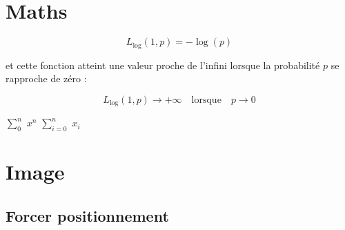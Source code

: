 \documentclass[12pt,a4paper]{article}
\begin{document}
		
	\section{Maths}
		
		\[
		L_{\log}(1, p) = -\log(p)
		\]
		
		et cette fonction atteint une valeur proche de l'infini lorsque la probabilité $p$ se rapproche de zéro :
		
		\[
		L_{\log}(1, p) \to +\infty \quad \text{lorsque} \quad p \to 0
		\]
		
		$\sum_{0}^{n}$ $x^n$
		$\sum_{i=0}^{n}$ $x_i$
		
		
	\section{Image}
		\subsection{Forcer positionnement}
		\begin{figure}[!h]			
		\end{figure}
		
\end{document}
